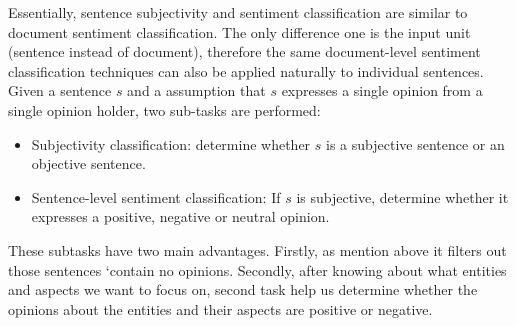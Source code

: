 \documentclass{article}
\begin{document}
Essentially, sentence subjectivity and sentiment classification are similar to document sentiment classification.
The only difference one is the input unit (sentence instead of document), therefore the same document-level sentiment classification techniques can also be applied naturally to individual sentences.
Given a sentence $s$ and a assumption that $s$ expresses a single opinion from a single opinion holder, two sub-tasks are performed:
\begin{itemize}
	\item Subjectivity classification: determine whether $s$ is a subjective sentence or an objective sentence.
	\item Sentence-level sentiment classification: If $s$ is subjective, determine whether it expresses a positive, negative or neutral opinion.
\end{itemize}
These subtasks have two main advantages. 
Firstly, as mention above it filters out those sentences `contain no opinions. 
Secondly, after knowing about what entities and aspects we want to focus on, second task help us determine whether the opinions about the entities and their aspects are positive or negative. 
\end{document}

